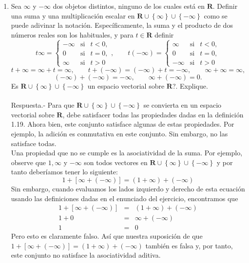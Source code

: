 \begin{enumerate}[\bfseries 1.]
    \item Sea $\infty$ y $-\infty$ dos objetos distintos, ninguno de los cuales está en $\textbf{R}$. Definir una suma y una multiplicación escalar en $\textbf{R}\cup \left\{\infty\right\}\cup\left\{-\infty\right\}$ como se puede adivinar la notación. Específicamente, la suma y el producto de dos números reales son los habituales, y  para $t\in \textbf{R}$ definir
    $$
    t\infty = \left\{\begin{array}{rcl}
	    -\infty & \mbox{si} & t<0,\\
	    0 & \mbox{si} & t=0,\\
	    \infty & \mbox{si} & t>0
    \end{array}\right.,\qquad 
    t(-\infty) = \left\{\begin{array}{rcl}
	    \infty & \mbox{si} & t<0,\\
	    0 & \mbox{si} & t=0,\\
	    -\infty & \mbox{si} & t>0
    \end{array}\right.
    $$
    $$t+\infty=\infty+t=\infty,\qquad t+(-\infty)=(-\infty)+t=-\infty,\qquad \infty+\infty=\infty,$$
    $$(-\infty)+(-\infty)=-\infty,\qquad \infty+(-\infty)=0.$$
    Es $\textbf{R}\cup \left\{\infty\right\}\cup \left\{-\infty\right\}$ un espacio vectorial sobre $\textbf{R}$?. Explique.\\\\
    Respuesta.-\; Para que $\textbf{R}\cup \left\{\infty\right\}\cup\left\{-\infty\right\}$ se convierta en un espacio vectorial sobre $\textbf{R}$,  debe satisfacer todas las propiedades dadas en la definición 1.19. Ahora bien, este conjunto satisface algunas de estas propiedades. Por ejemplo, la adición es conmutativa en este conjunto. Sin embargo, no las satisface todas.\\
    Una propiedad que no se cumple es la asociatividad de la suma. Por ejemplo, observe que $1,\infty$ y $-\infty$ son todos vectores en $\textbf{R}\cup \left\{\infty\right\}\cup\left\{-\infty\right\}$ y por tanto deberíamos tener lo siguiente:
    $$1+\left[\infty+(-\infty)\right]=(1+\infty)+(-\infty)$$
    Sin embargo, cuando evaluamos los lados izquierdo y derecho de esta ecuación usando las definiciones dadas en el enunciado del ejercicio, encontramos que
    $$\begin{array}{rcl}
    1+\left[\infty+(-\infty)\right] &=& (1+\infty)+(-\infty)\\
    1+0&=& \infty+(-\infty)\\
    1&=&0
    \end{array}$$
    Pero esto es claramente falso. Así que nuestra suposición de que $1 + \left[\infty + (-\infty)\right] = (1+\infty) + (-\infty)$ también es falsa y, por tanto, este conjunto no satisface la asociatividad aditiva.\\\\

\end{enumerate}


